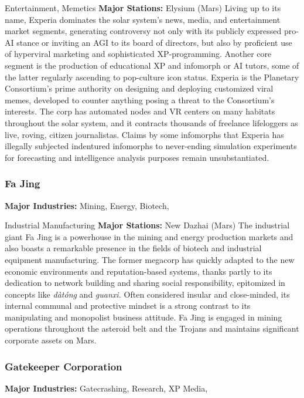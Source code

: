 Entertainment, Memetics
\textbf{Major Stations:} Elysium (Mars)
Living up to its name, Experia dominates the solar 
system's news, media, and entertainment market 
segments, generating controversy not only with its 
publicly expressed pro-AI stance or inviting an AGI 
to its board of directors, but also by proficient use 
of hyperviral marketing and sophisticated XP-programming. Another core segment is the production 
of educational XP and infomorph or AI tutors, some 
of the latter regularly ascending to pop-culture icon 
status. Experia is the Planetary Consortium's prime 
authority on designing and deploying customized 
viral memes, developed to counter anything posing 
a threat to the Consortium's interests. The corp has 
automated nodes and VR centers on many habitats 
throughout the solar system, and it contracts thousands of freelance lifeloggers as live, roving, citizen 
journalistas. Claims by some infomorphs that Experia 
has illegally subjected indentured infomorphs to never-ending simulation experiments for forecasting and 
intelligence analysis purposes remain unsubstantiated.

\subsubsection{Fa Jing}

\textbf{Major Industries:} Mining, Energy, Biotech, 

Industrial Manufacturing
\textbf{Major Stations:} New Dazhai (Mars)
The industrial giant Fa Jing is a powerhouse in the 
mining and energy production markets and also 
boasts a remarkable presence in the fields of biotech 
and industrial equipment manufacturing. The former 
megacorp has quickly adapted to the new economic 
environments and reputation-based systems, thanks 
partly to its dedication to network building and sharing social responsibility, epitomized in concepts like 
\textit{dàtóng} and \textit{guanxi.} Often considered insular and 
close-minded, its internal communal and protective 
mindset is a strong contrast to its manipulating and 
monopolist business attitude. Fa Jing is engaged in 
mining operations throughout the asteroid belt and 
the Trojans and maintains significant corporate assets 
on Mars.

\subsubsection{Gatekeeper Corporation}

\textbf{Major Industries:} Gatecrashing, Research, XP Media, 


